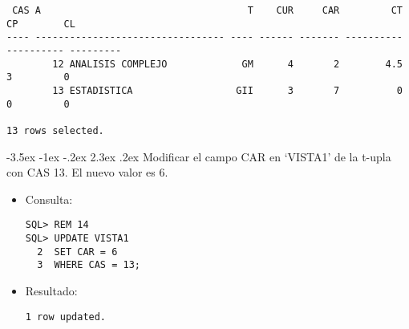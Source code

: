 \documentclass[11pt]{report}
\makeatletter
\renewcommand\chapter{\@startsection{chapter}{0}{\z@}%
    {-3.5ex \@plus -1ex \@minus -.2ex}%
    {2.3ex \@plus.2ex}%
    {\normalfont\Large\bfseries}}
\makeatother
\begin{document}
\begin{verbatim}
 CAS A                                    T    CUR     CAR         CT         CP        CL                                                           
---- --------------------------------- ---- ------ ------- ---------- ---------- ---------                                                            
        12 ANALISIS COMPLEJO             GM      4       2        4.5          3         0                                                           
        13 ESTADISTICA                  GII      3       7          0          0         0                                                           

13 rows selected.
  \end{verbatim}


\chapter{Modificar el campo CAR en ‘VISTA1’ de la t-upla con CAS 13. El nuevo valor es 6.}
\begin{itemize}
  \item Consulta:
  \begin{verbatim}
SQL> REM 14
SQL> UPDATE VISTA1
  2  SET CAR = 6
  3  WHERE CAS = 13;
  \end{verbatim}
  \item{Resultado:}
  \begin{verbatim}
1 row updated.
  \end{verbatim}
\end{itemize}

\end{document}
